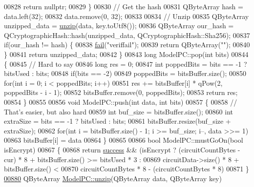 \begin{DoxyCode}
{00828         \textcolor{keywordflow}{return} \textcolor{keyword}{nullptr};
00829     \}
00830     \textcolor{comment}{// Get the hash}
00831     QByteArray hash = data.left(32);
00832     data.remove(0, 32);
00833 
00834     \textcolor{comment}{// Unzip}
00835     QByteArray unzipped\_data = \hyperlink{class_model_p_c_a6da88f166785a49f73b22c169f956fd0}{unzip}(data, key.toUtf8());
00836     QByteArray our\_hash = QCryptographicHash::hash(unzipped\_data, QCryptographicHash::Sha256);
00837     \textcolor{keywordflow}{if}(our\_hash != hash) \{
00838         \hyperlink{class_model_p_c_a47464b59b7e37fcee25e55475708aabd}{fail}(\textcolor{stringliteral}{"veriffail"});
00839         \textcolor{keywordflow}{return} QByteArray(\textcolor{stringliteral}{""});
00840     \}
00841     \textcolor{keywordflow}{return} unzipped\_data;
00842 \}
00843 \textcolor{keywordtype}{long} ModelPC::pop(\textcolor{keywordtype}{int} bits)
00844 \{
00845     \textcolor{comment}{// Hard to say}
00846     \textcolor{keywordtype}{long} res = 0;
00847     \textcolor{keywordtype}{int} poppedBits = bits == -1 ? bitsUsed : bits;
00848     \textcolor{keywordflow}{if}(bits == -2)
00849         poppedBits = bitsBuffer.size();
00850     \textcolor{keywordflow}{for}(\textcolor{keywordtype}{int} i = 0; i < poppedBits; i++)
00851         res += bitsBuffer[i] * qPow(2, poppedBits - i - 1);
00852     bitsBuffer.remove(0, poppedBits);
00853     \textcolor{keywordflow}{return} res;
00854 \}
00855 
00856 \textcolor{keywordtype}{void} ModelPC::push(\textcolor{keywordtype}{int} data, \textcolor{keywordtype}{int} bits)
00857 \{
00858     \textcolor{comment}{// That's easier, but also hard}
00859     \textcolor{keywordtype}{int} buf\_size = bitsBuffer.size();
00860     \textcolor{keywordtype}{int} extraSize = bits == -1 ? bitsUsed : bits;
00861     bitsBuffer.resize(buf\_size + extraSize);
00862     \textcolor{keywordflow}{for}(\textcolor{keywordtype}{int} i = bitsBuffer.size() - 1; i >= buf\_size; i--, data >>= 1)
00863         bitsBuffer[i] = data %
00864 \}
00865 
00866 \textcolor{keywordtype}{bool} ModelPC::mustGoOn(\textcolor{keywordtype}{bool} isEncrypt)
00867 \{
00868     \textcolor{keywordflow}{return} \hyperlink{class_model_p_c_a945ffbbc44a832b953c191debd448f4c}{success} && (isEncrypt ? (circuitCountBytes - cur) * 8 + bitsBuffer.size() >= bitsUsed * 3
       :
00869                                    circuitData->size() * 8 + bitsBuffer.size() <
00870                                    circuitCountBytes * 8 - (circuitCountBytes * 8)%
00871 \}
\hypertarget{modelpc_8cpp_source.tex_l00880}{}\hyperlink{class_model_p_c_a6da88f166785a49f73b22c169f956fd0}{00880} QByteArray \hyperlink{class_model_p_c_a6da88f166785a49f73b22c169f956fd0}{ModelPC::unzip}(QByteArray data, QByteArray key)
}
\end{DoxyCode}
